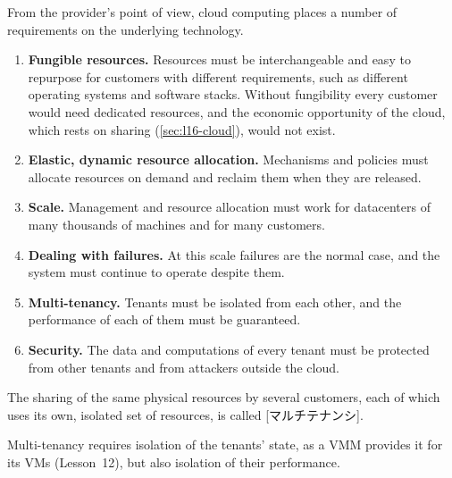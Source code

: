 \documentclass[../main.tex]{subfiles}
\begin{document}
From the provider's point of view, cloud computing places a number of
requirements on the underlying technology.
\begin{enumerate}
  \item \textbf{Fungible resources.}  Resources must be interchangeable and
    easy to repurpose for customers with different requirements, such as
    different operating systems and software stacks.  Without fungibility
    every customer would need dedicated resources, and the economic
    opportunity of the cloud, which rests on sharing
    (\cref{sec:l16-cloud}), would not exist.
  \item \textbf{Elastic, dynamic resource allocation.}  Mechanisms and
    policies must allocate resources on demand and reclaim them when they
    are released.
  \item \textbf{Scale.}  Management and resource allocation must work for
    datacenters of many thousands of machines and for many customers.
  \item \textbf{Dealing with failures.}  At this scale failures are the
    normal case, and the system must continue to operate despite
    them.
  \item \textbf{Multi-tenancy.}  Tenants must be isolated from each other,
    and the performance of each of them must be guaranteed.
  \item \textbf{Security.}  The data and computations of every tenant must be
    protected from other tenants and from attackers outside the cloud.
\end{enumerate}

\begin{definition}
  The sharing of the same physical resources by several customers, each of
  which uses its own, isolated set of resources, is called
  [マルチテナンシ].
\end{definition}

Multi-tenancy requires isolation of the tenants' state, as
a VMM provides it for its VMs (Lesson~12), but also isolation of their
performance.
\end{document}
